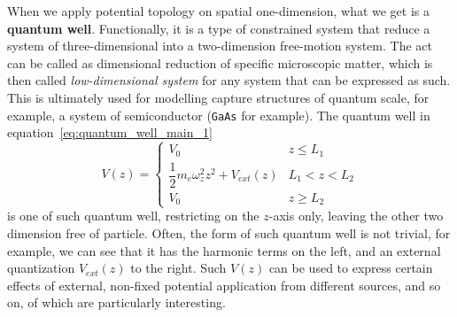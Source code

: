 \documentclass[%
 reprint,
 amsmath,amssymb,
 aps,
]{revtex4-2}
\begin{document}
When we apply potential topology on spatial one-dimension, what we get is a \textbf{quantum well}. Functionally, it is a type of constrained system that reduce a system of three-dimensional into a two-dimension free-motion system. The act can be called as dimensional reduction of specific microscopic matter, which is then called \textit{low-dimensional system} for any system that can be expressed as such. This is ultimately used for modelling capture structures of quantum scale, for example, a system of semiconductor (\texttt{GaAs} for example). The quantum well in equation~\ref{eq:quantum_well_main_1} 
\begin{equation}\label{eq:quantum_well_main_1}
    V(z)=\begin{cases}
        V_{0} & z \leq L_{1} \\
        \dfrac{1}{2}m_{{e}}\omega_{z}^{2}z^{2}+  V_{ext}(z) & L_{1} < z < L_{2}\\
        V_{0} & z \geq L_{2}
    \end{cases}
\end{equation}
is one of such quantum well, restricting on the $z$-axis only, leaving the other two dimension free of particle. Often, the form of such quantum well is not trivial, for example, we can see that it has the harmonic terms on the left, and an external quantization $V_{ext}(z)$ to the right. Such $V(z)$ can be used to express certain effects of external, non-fixed potential application from different sources, and so on, of which are particularly interesting. 
\end{document}
